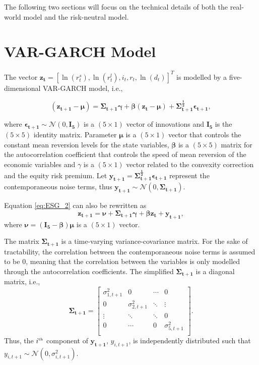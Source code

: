 \documentclass{sfuthesis}
\numberwithin{equation}{chapter}
\begin{document}
		\justify
		The following two sections will focus on the technical details of both the real-world model and the risk-neutral model.
	
		
	
	\section{VAR-GARCH Model} 
	\label{VAR-GARCH Model}
		\justify
		The vector $\boldsymbol{z_t} = [\ln(r_t^s), \ln(r_t^{l}), i_t, r_t, \ln(d_t)]^T$ is modelled by a five-dimensional VAR-GARCH model, i.e.,
	
		\begin{equation}
		\label{eq:ESG_2}
		\boldsymbol{(z_{t+1} - \mu) = \Sigma_{t+1}\gamma+ \beta (z_{t}-\mu) + \Sigma_{t+1}^{\frac{1}{2}}\epsilon_{t+1}},
		\end{equation}
	
		\justify
		where $\boldsymbol{\epsilon_{t+1}} \sim \mathcal{N}(0,\boldsymbol{I_5})$ is a $(5 \times 1)$ vector of innovations and $\boldsymbol{I_{5}}$ is the $(5 \times 5)$ identity matrix. Parameter $\boldsymbol{\mu}$ is a $(5 \times 1)$ vector that controls the constant mean reversion levels for the state variables, $\boldsymbol{\beta}$ is a $(5 \times 5)$ matrix for the autocorrelation coefficient that controls the speed of mean reversion of the economic variables and $\gamma$ is a $(5 \times 1)$ vector related to the convexity correction and the equity risk premium. Let $\boldsymbol{y_{t+1} = \Sigma_{t+1}^{\frac{1}{2}}\epsilon_{t+1}}$ represent the contemporaneous noise terms, thus $\boldsymbol{y_{t+1}} \sim \mathcal{N}(0,\boldsymbol{\Sigma_{t+1}})$.
	
		\justify
		Equation \eqref{eq:ESG_2} can also be rewritten as
		\begin{equation}
		\label{eq:ESG_3}
		\boldsymbol{z_{t+1} = \nu + \Sigma_{t+1}\gamma + \beta z_{t} + y_{t+1}},
		\end{equation}
		where $\boldsymbol{\nu = (I_5 - \beta) \mu}$ is a $(5 \times 1)$ vector. 

	
		\justify
		The matrix $\boldsymbol{\Sigma_{t+1}}$ is a time-varying variance-covariance matrix. For the sake of tractability, the correlation between the contemporaneous noise terms is assumed to be $0$, meaning that the correlation between the variables is only modelled through the autocorrelation coefficients. The simplified $\boldsymbol{\Sigma_{t+1}}$ is a diagonal matrix, i.e.,
		\[
		\boldsymbol{\Sigma_{t+1}} =
		\begin{bmatrix}
		\sigma^2_{1,t+1} &0                 &\cdots & 0              \\
		0                &\sigma^2_{2,t+1}  &\ddots &\vdots          \\
		\vdots           & \ddots           &\ddots & 0               \\
		0                & \cdots           &0      &\sigma^2_{5,t+1}\\    
		\end{bmatrix}.
		\]
		Thus, the $i^{\text{\tiny{th}}}$ component of $\boldsymbol{y_{t+1}}$, $y_{i,t+1}$, is independently distributed such that $y_{i,t+1}\sim \mathcal{N}(0, \sigma^2_{i,t+1})$.
\end{document}
